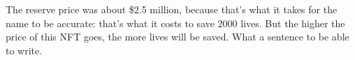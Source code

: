 The reserve
                  price was about \$2.5 million, because that's what it takes for
                  the name to be accurate: that's what it costs to save 2000
                  lives. But the higher the price of this NFT goes, the more
                  lives will be saved. What a sentence to be able to write.


              
            
          
            
              
                


                  
              
            
          
